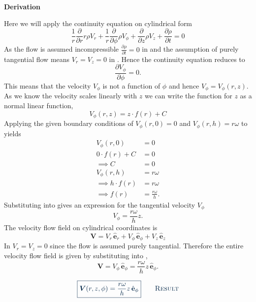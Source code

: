 \documentclass[a4paper]{article}
\renewcommand{\Vec}[1]{\boldsymbol{#1}}
\let\oldhat\hat
\renewcommand{\hat}[1]{\oldhat{\mathbf{#1}}}
\numberwithin{equation}{problem}
\newcommand{\AUheading}[1]{%
  \par\vspace{.4\baselineskip}%
  {\sffamily\bfseries\color{AUblueDark}#1\par}%
  \nobreak%
}
\newenvironment{derivation}[1][Derivation]{%
  \AUheading{#1}
  \begingroup\allowdisplaybreaks
  \setlength{\abovedisplayskip}{6pt}%
  \setlength{\belowdisplayskip}{6pt}%
  \setlength{\abovedisplayshortskip}{4pt}%
  \setlength{\belowdisplayshortskip}{4pt}%
}{\par\endgroup\medskip}
\newcommand{\finalresult}[1]{%
  \vspace{.2\baselineskip}%
  \begin{equation}
    {\color{AUblueDark}\boxed{\displaystyle #1}}
    \tag*{\textsc{\textcolor{AUblueDark}{Result}}}
  \end{equation}
  \newpage
}
\begin{document}
\begin{derivation}
Here we will apply the continuity equation on cylindrical form
\begin{equation}\label{eq:contcyn}
  \frac{1}{r} \frac{\partial}{\partial r} r \rho V_r + \frac{1}{r}\frac{\partial }{\partial \phi} \rho V_{\phi} + \frac{\partial }{\partial z} \rho V_z + \frac{\partial \rho}{\partial t} = 0
\end{equation}
As the flow is assumed incompressible $\frac{\partial \rho}{\partial t} = 0$ in  and the assumption of purely tangential flow means $V_r = V_z = 0$ in .
Hence the continuity equation reduces to
\[ 
  \frac{\partial V_{\phi}}{\partial \phi} = 0
.\]
This means that the velocity $V_{\phi}$ is not a function of $\phi$ and hence $V_{\phi} = V_{\phi} \left( r, z \right)$.
As we know the velocity scales linearly with $z$ we can write the function for $z$ as a normal linear function,
\begin{equation} \label{eq:linvel}
 V_{\phi} \left( r, z \right) = z \cdot f(r) + C
\end{equation}
Applying the given boundary conditions of $V_{\phi} \left( r, 0 \right) = 0$ and $V_{\phi} \left( r, h \right) = r \omega$ to  yields
  \begin{align}
  V_{\phi} \left( r, 0 \right) &= 0 \nonumber \\
  0 \cdot f(r) + C &= 0 \nonumber \\
  \implies C &= 0 \nonumber \\
  V_{\phi} \left( r, h \right) &= r \omega \nonumber \\
  \implies h \cdot f(r) &= r\omega \nonumber \\
  \implies f(r) &= \frac{r\omega}{h} \label{eq:fr}
.\end{align}
Substituting  into  gives an expression for the tangential velocity $V_{\phi}$
\begin{equation}\label{eq:vphi}
    V_{\phi} = \frac{r\omega}{h}z
.\end{equation}
The velocity flow field on cylindrical coordinates is
\begin{equation}\label{eq:velcyn}
  \Vec{V} = V_r \,  \hat{e}_r + V_{\phi} \, \hat{e}_{\phi} + V_z \,  \hat{e}_z
\end{equation}
In  $V_r = V_z = 0$ since the flow is assumed purely tangential.
Therefore the entire velocity flow field is given by substituting  into ,
\[ 
\Vec{V} = V_{\phi} \, \hat{e}_{\phi} = \frac{r\omega}{h}z \, \hat{e}_{\phi}
.\]
\end{derivation}

\finalresult{\Vec{V}(r,z,\phi) = \frac{r\omega}{h}z \,  \hat{e}_{\phi}}
\end{document}
